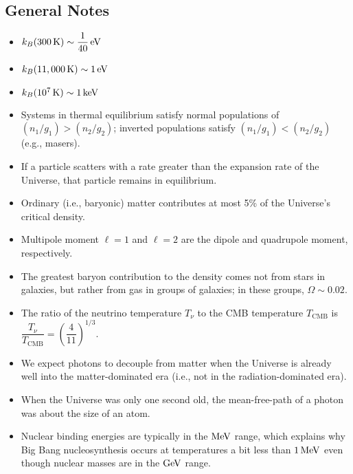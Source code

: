 \documentclass[a4paper,11pt]{article}
\begin{document}

\newpage
\subsection{General Notes}

\begin{itemize}
    \item $k_B(300\,\mathrm{K}) \sim \dfrac{1}{40}\,{\rm eV}$
    \item $k_B(11,000\,\mathrm{K}) \sim 1\,{\rm eV}$
    \item $k_B(10^7\,\mathrm{K}) \sim 1\,{\rm keV}$
    \item Systems in thermal equilibrium satisfy normal populations of $(n_1/g_1)>(n_2/g_2)$; inverted populations satisfy $(n_1/g_1)<(n_2/g_2)$ (e.g., masers).
    \item If a particle scatters with a rate greater than the expansion rate of the Universe, that particle remains in equilibrium.
    \item Ordinary (i.e., baryonic) matter contributes at most 5\% of the Universe's critical density.
    \item Multipole moment $\ell=1$ and $\ell=2$ are the dipole and quadrupole moment, respectively.
    \item The greatest baryon contribution to the density comes not from stars in galaxies, but rather from gas in groups of galaxies; in these groups, $\Omega\sim0.02$.
    \item The ratio of the neutrino temperature $T_\nu$ to the CMB temperature $T_\mathrm{CMB}$ is $\dfrac{T_\nu}{T_\mathrm{CMB}} = \left( \dfrac{4}{11} \right)^{1/3}$.
    \item We expect photons to decouple from matter when the Universe is already well into the matter-dominated era (i.e., not in the radiation-dominated era).
    \item When the Universe was only one second old, the mean-free-path of a photon was about the size of an atom.
    \item Nuclear binding energies are typically in the $\rm{MeV}$ range, which explains why Big Bang nucleosynthesis occurs at temperatures a bit less than $1\,\rm{MeV}$ even though nuclear masses are in the $\rm{GeV}$ range.

\end{itemize}
\end{document}

